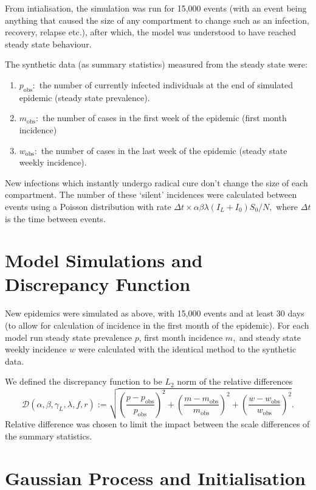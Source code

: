 From intialisation, the simulation was run for 15,000 events
(with an event being anything that caused the size of any compartment to change
such as an infection, recovery, relapse etc.), after which, the model was
understood to have reached steady state behaviour.

The synthetic data (as summary statistics) measured from the steady state
were:
\begin{enumerate}
    \item $p_\text{obs}:$ the number of currently infected individuals at the
          end of simulated epidemic (steady state prevalence).
    \item $m_\text{obs}:$ the number of cases in the first week of the epidemic
          (first month incidence)
    \item $w_\text{obs}:$ the number of cases in the last week of the epidemic
          (steady state weekly incidence).
\end{enumerate}

New infections which instantly undergo radical cure don't change the size of
each compartment. The number of these `silent' incidences were calculated
between events using a Poisson distribution with rate
$\Delta t \times \alpha \beta \lambda (I_L + I_0) S_0 / N,$ where $\Delta t$ is
the time between events.

\section{Model Simulations and Discrepancy Function}

New epidemics were simulated as above, with 15,000 events and at least 30
days (to allow for calculation of incidence in the first month of the
epidemic). For each model run steady state prevalence $p$,
first month incidence $m,$ and steady state weekly incidence $w$ were
calculated with the identical method to the synthetic data.

We defined the discrepancy function to be $L_2$ norm of the relative
differences
$$
    \mathcal{D}(\alpha, \beta, \gamma_L, \lambda, f, r)
    := \sqrt{
        \left(\frac{p - p_\text{obs}}{p_\text{obs}}\right)^2
        + \left(\frac{m - m_\text{obs}}{m_\text{obs}}\right)^2
        + \left(\frac{w - w_\text{obs}}{w_\text{obs}}\right)^2
    }.
$$
Relative difference was chosen to limit the impact between the scale
differences of the summary statistics.

\section{Gaussian Process and Initialisation}

